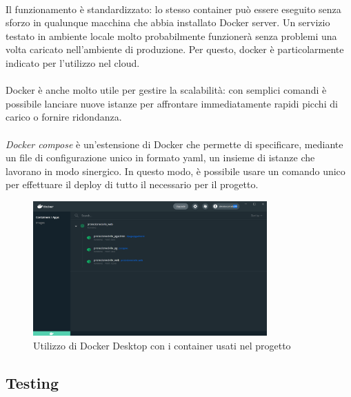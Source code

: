 \documentclass[11pt,a4paper,english]{article}
\begin{document}
\paragraph{} Il funzionamento è standardizzato: lo stesso container può essere eseguito senza sforzo in qualunque macchina che abbia installato Docker server. Un servizio testato in ambiente locale molto probabilmente funzionerà senza problemi una volta caricato nell'ambiente di produzione. Per questo, docker è particolarmente indicato per l'utilizzo nel cloud. 

\paragraph{} Docker è anche molto utile per gestire la scalabilità: con semplici comandi è possibile lanciare nuove istanze per affrontare immediatamente rapidi picchi di carico o fornire ridondanza. 

\paragraph{} \emph{Docker compose} è un'estensione di Docker che permette di specificare, mediante un file di configurazione unico in formato yaml, un insieme di istanze che lavorano in modo sinergico. In questo modo, è possibile usare un comando unico per effettuare il deploy di tutto il necessario per il progetto.

\begin{figure}[H]
    \centering
    \includegraphics[width=0.8\textwidth]{img/docker.png}
    \caption{Utilizzo di Docker Desktop con i container usati nel progetto}
\end{figure}


\subsection{Testing}
\end{document}
